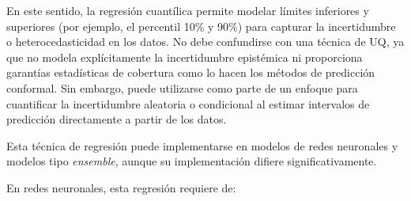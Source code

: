 En este sentido, la regresión cuantílica permite modelar límites inferiores y superiores (por ejemplo, el 
percentil 10\% y 90\%) para capturar la incertidumbre o heterocedasticidad en los datos.
No debe confundirse con una técnica de UQ, ya que no modela explícitamente la incertidumbre epistémica ni 
proporciona garantías estadísticas de cobertura como lo hacen los métodos de predicción conformal. Sin 
embargo, puede utilizarse como parte de un enfoque para cuantificar la incertidumbre aleatoria o 
condicional al estimar intervalos de predicción directamente a partir de los datos.

Esta técnica de regresión puede implementarse en modelos de redes neuronales y modelos tipo \textit{ensemble}, 
aunque su implementación difiere significativamente. 

En redes neuronales, esta regresión requiere de:

